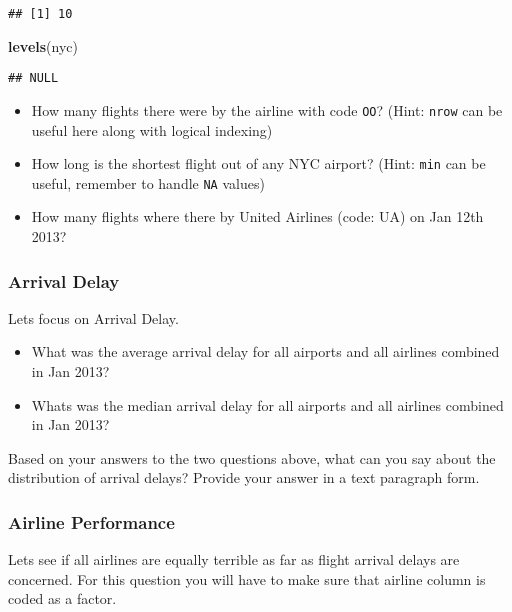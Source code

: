 \documentclass[
]{article}
\newenvironment{Shaded}{\begin{snugshade}}{\end{snugshade}}
\newcommand{\KeywordTok}[1]{\textcolor[rgb]{0.13,0.29,0.53}{\textbf{#1}}}
\newcommand{\NormalTok}[1]{#1}
\begin{document}
\begin{verbatim}
## [1] 10
\end{verbatim}

\begin{Shaded}
\begin{Highlighting}[]
\KeywordTok{levels}\NormalTok{(nyc)}
\end{Highlighting}
\end{Shaded}

\begin{verbatim}
## NULL
\end{verbatim}

\begin{itemize}
\item
  How many flights there were by the airline with code \texttt{OO}?
  (Hint: \texttt{nrow} can be useful here along with logical indexing)
\item
  How long is the shortest flight out of any NYC airport? (Hint:
  \texttt{min} can be useful, remember to handle \texttt{NA} values)
\item
  How many flights where there by United Airlines (code: UA) on Jan 12th
  2013?
\end{itemize}

\hypertarget{arrival-delay}{%
\subsubsection{Arrival Delay}\label{arrival-delay}}

Lets focus on Arrival Delay.

\begin{itemize}
\item
  What was the average arrival delay for all airports and all airlines
  combined in Jan 2013?
\item
  Whats was the median arrival delay for all airports and all airlines
  combined in Jan 2013?
\end{itemize}

Based on your answers to the two questions above, what can you say about
the distribution of arrival delays? Provide your answer in a text
paragraph form.

\hypertarget{airline-performance}{%
\subsubsection{Airline Performance}\label{airline-performance}}

Lets see if all airlines are equally terrible as far as flight arrival
delays are concerned. For this question you will have to make sure that
airline column is coded as a factor.
\end{document}
